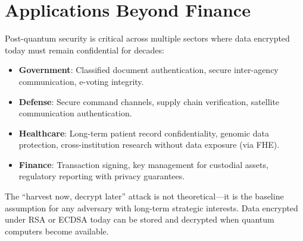 \section{Applications Beyond Finance}


Post-quantum security is critical across multiple sectors where data
encrypted today must remain confidential for decades:

\begin{itemize}[nosep]
  \item \textbf{Government}: Classified document authentication,
        secure inter-agency communication, e-voting integrity.
  \item \textbf{Defense}: Secure command channels, supply chain
        verification, satellite communication authentication.
  \item \textbf{Healthcare}: Long-term patient record confidentiality,
        genomic data protection, cross-institution research without
        data exposure (via FHE).
  \item \textbf{Finance}: Transaction signing, key management for
        custodial assets, regulatory reporting with privacy guarantees.
\end{itemize}

The ``harvest now, decrypt later'' attack is not theoretical---it is
the baseline assumption for any adversary with long-term strategic
interests. Data encrypted under RSA or ECDSA today can be stored and
decrypted when quantum computers become available.

